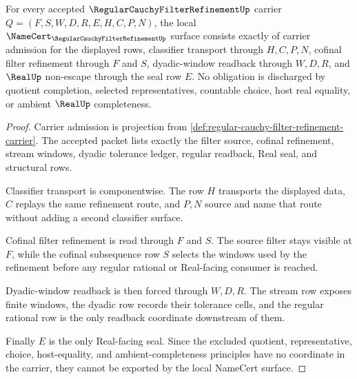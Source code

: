 \begin{theorem}
\label{thm:regular-cauchy-filter-refinement-obligations}
For every accepted $\RegularCauchyFilterRefinementUp$ carrier $Q=(F,S,W,D,R,E,H,C,P,N)$, the local $\NameCert_{\RegularCauchyFilterRefinementUp}$ surface consists exactly of carrier admission for the displayed rows, classifier transport through $H,C,P,N$, cofinal filter refinement through $F$ and $S$, dyadic-window readback through $W,D,R$, and $\RealUp$ non-escape through the seal row $E$. No obligation is discharged by quotient completion, selected representatives, countable choice, host real equality, or ambient $\RealUp$ completeness.
\end{theorem}
\begin{proof}
Carrier admission is projection from \autoref{def:regular-cauchy-filter-refinement-carrier}. The accepted packet lists exactly the filter source, cofinal refinement, stream windows, dyadic tolerance ledger, regular readback, Real seal, and structural rows.

Classifier transport is componentwise. The row $H$ transports the displayed data, $C$ replays the same refinement route, and $P,N$ source and name that route without adding a second classifier surface.

Cofinal filter refinement is read through $F$ and $S$. The source filter stays visible at $F$, while the cofinal subsequence row $S$ selects the windows used by the refinement before any regular rational or Real-facing consumer is reached.

Dyadic-window readback is then forced through $W,D,R$. The stream row exposes finite windows, the dyadic row records their tolerance cells, and the regular rational row is the only readback coordinate downstream of them.

Finally $E$ is the only Real-facing seal. Since the excluded quotient, representative, choice, host-equality, and ambient-completeness principles have no coordinate in the carrier, they cannot be exported by the local NameCert surface.
\end{proof}

